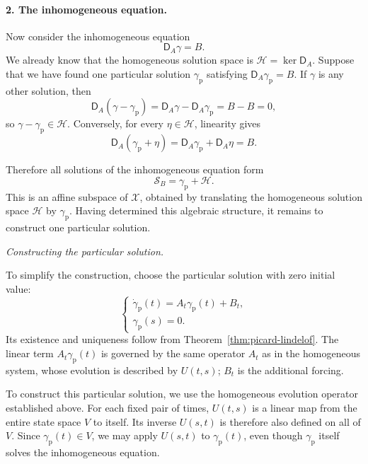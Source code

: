 \documentclass[12pt,a4paper,oneside]{book}
\begin{document}
\begin{example}
\begin{solution}
\paragraph{2. The inhomogeneous equation.}
Now consider the inhomogeneous equation
\begin{equation*}
    \mathsf D_A\gamma=B.
\end{equation*}
We already know that the homogeneous solution space is $\mathcal H=\ker\mathsf D_A$. Suppose that we have found one particular
solution $\gamma_{\mathrm p}$ satisfying $\mathsf D_A\gamma_{\mathrm p}=B$. If $\gamma$ is any other solution, then
\begin{equation*}
    \mathsf D_A(\gamma-\gamma_{\mathrm p}) = \mathsf D_A\gamma-\mathsf D_A\gamma_{\mathrm p} = B - B = 0,
\end{equation*}
so $\gamma-\gamma_{\mathrm p}\in\mathcal H$. Conversely, for every $\eta\in\mathcal H$, linearity gives
\begin{equation*}
    \mathsf D_A(\gamma_{\mathrm p}+\eta) = \mathsf D_A\gamma_{\mathrm p}+\mathsf D_A\eta = B.
\end{equation*}

Therefore all solutions of the inhomogeneous equation form
\begin{equation*}
    \mathcal S_{B}=\gamma_{\mathrm p}+\mathcal H.
\end{equation*}
This is an affine subspace of $\mathcal X$, obtained by translating the homogeneous solution space $\mathcal H$ by $\gamma_{\mathrm p}$.
Having determined this algebraic structure, it remains to construct one particular solution.

\textit{Constructing the particular solution.}

To simplify the construction, choose the particular solution with zero initial value:
\begin{equation*}
    \begin{cases}
        \dot\gamma_{\mathrm p}(t)=A_t\gamma_{\mathrm p}(t)+B_t,\\
        \gamma_{\mathrm p}(s)=0.
    \end{cases}
\end{equation*}
Its existence and uniqueness follow from Theorem~\ref{thm:picard-lindelof}. The linear term $A_t\gamma_{\mathrm p}(t)$ is
governed by the same operator $A_t$ as in the homogeneous system, whose evolution is described by $U(t,s)$; $B_t$
is the additional forcing.

To construct this particular solution, we use the homogeneous evolution operator established above. For each fixed pair
of times, $U(t,s)$ is a linear map from the entire state space $V$ to itself. Its inverse $U(s,t)$ is therefore also defined
on all of $V$. Since $\gamma_{\mathrm p}(t)\in V$, we may apply $U(s,t)$ to $\gamma_{\mathrm p}(t)$, even though $\gamma_{\mathrm p}$
itself solves the inhomogeneous equation.


\end{solution}
\end{example}
\end{document}
